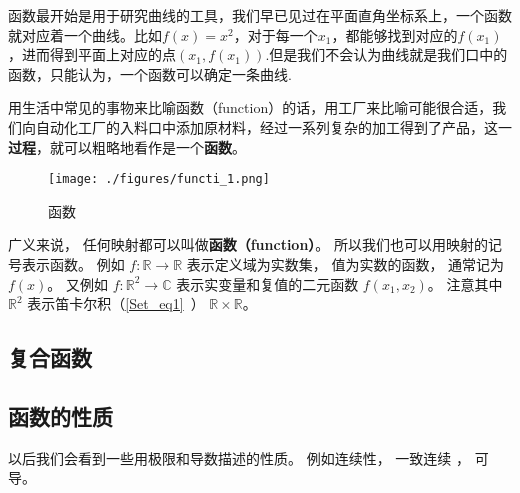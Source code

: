 

\begin{issues}
\issueDraft
\issueTODO
\end{issues}

函数最开始是用于研究曲线的工具，我们早已见过在平面直角坐标系上，一个函数就对应着一个曲线。比如$f(x)=x^2$，对于每一个$x_1$，都能够找到对应的$f(x_1)$，进而得到平面上对应的点$(x_1,f(x_1))$.但是我们不会认为曲线就是我们口中的函数，只能认为，一个函数可以确定一条曲线.

用生活中常见的事物来比喻函数（function）的话，用工厂来比喻可能很合适，我们向自动化工厂的入料口中添加原材料，经过一系列复杂的加工得到了产品，这一\textbf{过程}，就可以粗略地看作是一个\textbf{函数}。

\begin{figure}[ht]
\centering
\texttt{[image: ./figures/functi\_1.png]}
\caption{函数} \label{functi_fig1}
\end{figure}


广义来说， 任何映射都可以叫做\textbf{函数（function）}。 所以我们也可以用映射的记号表示函数。 例如 $f: \mathbb R \to \mathbb R$ 表示定义域为实数集， 值为实数的函数， 通常记为 $f(x)$。 又例如 $f: \mathbb R^2 \to \mathbb C$ 表示实变量和复值的二元函数 $f(x_1, x_2)$。 注意其中 $\mathbb R^2$ 表示笛卡尔积（\autoref{Set_eq1}~） $\mathbb R \times \mathbb R$。

\subsection{复合函数}

\subsection{函数的性质}
以后我们会看到一些用极限和导数描述的性质。 例如连续性， 一致连续 %
， 可导。
